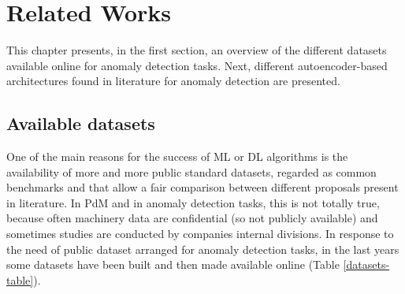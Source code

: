 \chapter{Related Works}

This chapter presents, in the first section, an overview of the different datasets available online for anomaly detection tasks. Next, different autoencoder-based architectures found in literature for anomaly detection are presented.

\section{Available datasets}
One of the main reasons for the success of ML or DL algorithms is the availability of more and more public standard datasets, regarded as common benchmarks and that allow a fair comparison between different proposals present in literature. In PdM and in anomaly detection tasks, this is not totally true, because often machinery data are confidential (so not publicly available) and sometimes studies are conducted by companies internal divisions. In response to the need of public dataset arranged for anomaly detection tasks, in the last years some datasets have been built and then made available online (Table \ref{datasets-table}).\\

